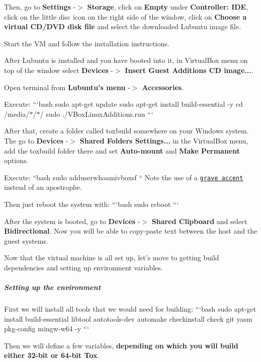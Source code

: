 Then, go to {\bfseries Settings} -\/$>$ {\bfseries Storage}, click on {\bfseries Empty} under {\bfseries Controller\+: I\+D\+E}, click on the little disc icon on the right side of the window, click on {\bfseries Choose a virtual C\+D/\+D\+V\+D disk file} and select the downloaded Lubuntu image file.

Start the V\+M and follow the installation instructions.

After Lubuntu is installed and you have booted into it, in Virtual\+Box menu on top of the window select {\bfseries Devices} -\/$>$ {\bfseries Insert Guest Additions C\+D image...}.

Open terminal from {\bfseries Lubuntu's menu} -\/$>$ {\bfseries Accessories}.

Execute\+: ```bash sudo apt-\/get update sudo apt-\/get install build-\/essential -\/y cd /media/$\ast$/$\ast$/ sudo ./\+V\+Box\+Linux\+Additions.run ```

After that, create a folder called {\ttfamily toxbuild} somewhere on your Windows system. The go to {\bfseries Devices} -\/$>$ {\bfseries Shared Folders Settings...} in the Virtual\+Box menu, add the {\ttfamily toxbuild} folder there and set {\bfseries Auto-\/mount} and {\bfseries Make Permanent} options.

Execute\+: ``{\ttfamily bash sudo adduser}whoami{\ttfamily vboxsf }`` Note the use of a \href{http://en.wikipedia.org/wiki/Grave_accent}{\tt grave accent} instead of an apostrophe.

Then just reboot the system with\+: ```bash sudo reboot ```

After the system is booted, go to {\bfseries Devices} -\/$>$ {\bfseries Shared Clipboard} and select {\bfseries Bidirectional}. Now you will be able to copy-\/paste text between the host and the guest systems.

Now that the virtual machine is all set up, let's move to getting build dependencies and setting up environment variables.

\label{_windows-cross-compile-environment}%
 \subparagraph*{Setting up the environment}

First we will install all tools that we would need for building\+: ```bash sudo apt-\/get install build-\/essential libtool autotools-\/dev automake checkinstall check git yasm pkg-\/config mingw-\/w64 -\/y ```

Then we will define a few variables, {\bfseries depending on which you will build either 32-\/bit or 64-\/bit Tox}.

